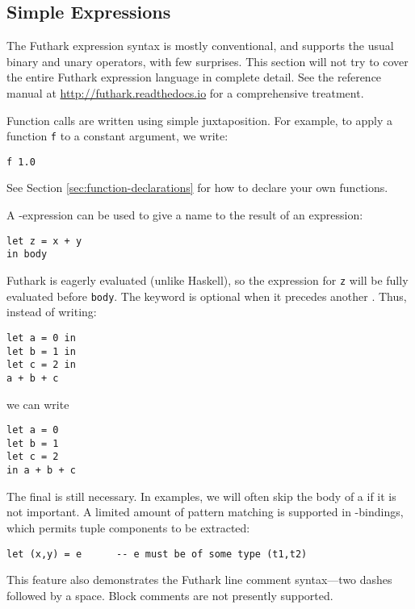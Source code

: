 \documentclass[oneside,11pt]{book}
\begin{document}
\subsection{Simple Expressions}

The Futhark expression syntax is mostly conventional, and supports the
usual binary and unary operators, with few surprises.  This section
will not try to cover the entire Futhark expression language in
complete detail.  See the reference manual at
\url{http://futhark.readthedocs.io} for a comprehensive treatment.

Function calls are written using simple juxtaposition.  For example,
to apply a function \texttt{f} to a constant argument, we write:

\begin{lstlisting}
f 1.0
\end{lstlisting}

\noindent
See Section \ref{sec:function-declarations} for how to declare your
own functions.

A -expression can be used to give a name to the result of
an expression:

\begin{lstlisting}
let z = x + y
in body
\end{lstlisting}

Futhark is eagerly evaluated (unlike Haskell), so the expression for
\texttt{z} will be fully evaluated before \texttt{body}.  The  keyword is optional when it precedes another
.  Thus, instead of writing:

\begin{lstlisting}
let a = 0 in
let b = 1 in
let c = 2 in
a + b + c
\end{lstlisting}

\noindent
we can write

\begin{lstlisting}
let a = 0
let b = 1
let c = 2
in a + b + c
\end{lstlisting}

\noindent
The final  is still necessary.  In examples, we will often
skip the body of a  if it is not important.  A limited
amount of pattern matching is supported in -bindings,
which permits tuple components to be extracted:

\begin{lstlisting}
let (x,y) = e      -- e must be of some type (t1,t2)
\end{lstlisting}

\noindent
This feature also demonstrates the Futhark line comment syntax---two dashes
followed by a space.  Block comments are not presently supported.
\end{document}
